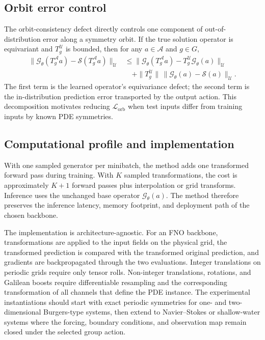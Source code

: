 \subsection{Orbit error control}
The orbit-consistency defect directly controls one component of out-of-distribution error along a symmetry orbit. If the true solution operator is equivariant and \(T_g^{\mathcal{U}}\) is bounded, then for any \(a\in\mathcal{A}\) and \(g\in G\),
\[
\begin{aligned}
    \|\mathcal{G}_\theta(T_g^{\mathcal{A}}a)-\mathcal{S}(T_g^{\mathcal{A}}a)\|_{\mathcal{U}}
    &\le
    \|\mathcal{G}_\theta(T_g^{\mathcal{A}}a)-T_g^{\mathcal{U}}\mathcal{G}_\theta(a)\|_{\mathcal{U}} \\
    &\quad+
    \|T_g^{\mathcal{U}}\|\,
    \|\mathcal{G}_\theta(a)-\mathcal{S}(a)\|_{\mathcal{U}}.
\end{aligned}
\]
The first term is the learned operator's equivariance defect; the second term is the in-distribution prediction error transported by the output action. This decomposition motivates reducing \(\mathcal{L}_{\mathrm{orb}}\) when test inputs differ from training inputs by known PDE symmetries.

\subsection{Computational profile and implementation}
With one sampled generator per minibatch, the method adds one transformed forward pass during training. With \(K\) sampled transformations, the cost is approximately \(K+1\) forward passes plus interpolation or grid transforms. Inference uses the unchanged base operator \(\mathcal{G}_\theta(a)\). The method therefore preserves the inference latency, memory footprint, and deployment path of the chosen backbone.

The implementation is architecture-agnostic. For an FNO backbone, transformations are applied to the input fields on the physical grid, the transformed prediction is compared with the transformed original prediction, and gradients are backpropagated through the two evaluations. Integer translations on periodic grids require only tensor rolls. Non-integer translations, rotations, and Galilean boosts require differentiable resampling and the corresponding transformation of all channels that define the PDE instance. The experimental instantiations should start with exact periodic symmetries for one- and two-dimensional Burgers-type systems, then extend to Navier--Stokes or shallow-water systems where the forcing, boundary conditions, and observation map remain closed under the selected group action.
